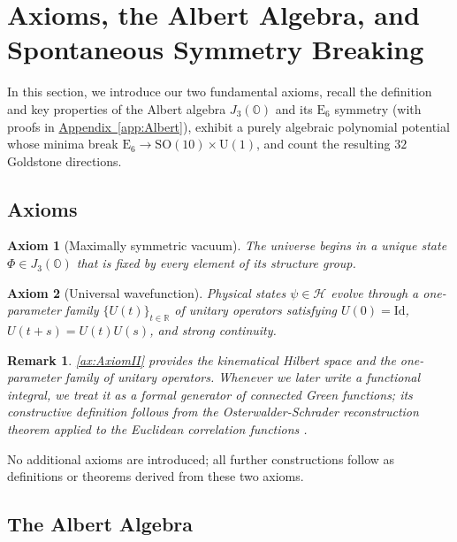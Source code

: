 \documentclass[pdflatex,sn-mathphys-num]{sn-jnl}
\theoremstyle{thmstyleone}
\newtheorem{axiom}[axiom]{Axiom}
\theoremstyle{thmstyletwo}%
\newtheorem{remark}{Remark}%
\theoremstyle{thmstylethree}%
\newcommand{\SO}[1]{\mathrm{SO(#1)}}
\newcommand{\U}[1]{\mathrm{U(#1)}}
\newcommand{\E}[1]{\mathrm{E_{#1}}}
\newcommand{\jalg}{J_3(\mathbb{O})}
\newcommand{\SOTen}{\SO{10}}
\newcommand{\UOne}{\U{1}}
\newcommand{\ESix}{\E{6}}
\newcommand{\SOTenXUOne}{\SOTen \times \UOne}
\newcommand{\appref}[1]{\hyperref[#1]{Appendix~\ref*{#1}}}
\begin{document}
\section{Axioms, the Albert Algebra, and Spontaneous Symmetry Breaking}
\label{sec:AxiomsAlbertSSB}
In this section, we introduce our two fundamental axioms, recall the definition and key properties of the Albert algebra $J_{3}(\mathbb O)$ and its $\ESix$ symmetry (with proofs in \appref{app:Albert}), exhibit a purely algebraic polynomial potential whose minima break $\ESix\to \SOTenXUOne$, and count the resulting $32$ Goldstone directions.

\subsection{Axioms}\label{subsec:Axioms}
\begin{axiom}[Maximally symmetric vacuum]\label{ax:AxiomI}
The universe begins in a unique state $\Phi\in\jalg$ that is fixed by every element of its structure group.
\end{axiom}
\begin{axiom}[Universal wavefunction]\label{ax:AxiomII}
Physical states $\psi\in\mathcal H$ evolve through a one-parameter family
$\{U(t)\}_{t\in\mathbb R}$ of unitary operators satisfying $U(0)=\mathrm{Id}$, $U(t+s)=U(t)U(s)$, and strong continuity.
\end{axiom}

\begin{remark}
\autoref{ax:AxiomII} provides the kinematical Hilbert space and the one-parameter
family of unitary operators.  Whenever we later write a functional integral, we treat it as a formal generator of connected Green functions; its constructive definition follows from the Osterwalder-Schrader reconstruction theorem applied to the Euclidean correlation functions \cite{GlimmJaffe:1987}.
\end{remark}


No additional axioms are introduced; all further constructions follow as definitions or theorems derived from these two axioms.

\subsection{The Albert Algebra}
\label{subsec:Albert}
\end{document}
